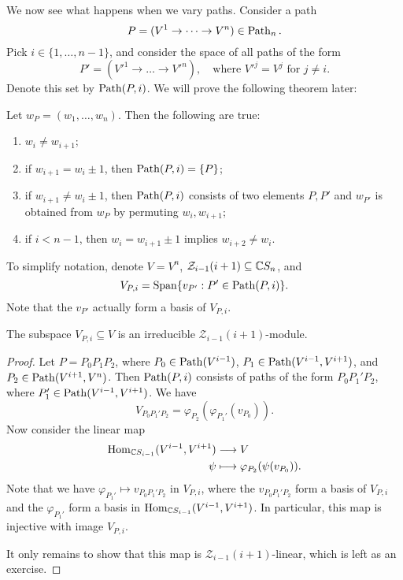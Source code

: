 \begin{remark}
  We now see what happens when we
  vary paths. Consider a path
  \[P = (V^1 \to \dots \to V^n) \in \operatorname{Path}_n.\]
  Pick $i \in \{1, \ldots, n - 1\}$, and
  consider the space of all paths
  of the form
  \[
    P' = (V'^1 \to \dots \to V'^n),
    \quad \text{where } V'^j = V^j
    \text{ for } j \ne i.
  \]
  Denote this set by $\operatorname{Path}(P, i)$.
  We will prove the following theorem later:
\end{remark}

\begin{theorem}\label{thm:path-varying}
  Let $w_P = (w_1, \dots, w_n)$. Then
  the following are true:
  \begin{enumerate}
    \item $w_i \ne w_{i + 1}$;
    \item if $w_{i + 1} = w_i \pm 1$, then
      $\operatorname{Path}(P, i) = \{P\}$;
    \item if $w_{i + 1} \ne w_i \pm 1$, then
      $\operatorname{Path}(P, i)$ consists of
      two elements $P, P'$ and
      $w_{P'}$ is obtained from
      $w_P$ by permuting
      $w_i, w_{i + 1}$;
    \item if $i < n - 1$, then
      $w_i = w_{i + 1} \pm 1$ implies
      $w_{i + 2} \ne w_i$.
  \end{enumerate}
\end{theorem}

\begin{remark}
  To simplify notation, denote
  $V = V^n$, $\mathcal{Z}_{i - 1}(i + 1) \subseteq \mathbb{C} S_n$, and
  \[
    V_{P, i} = \operatorname{Span}\{v_{P'} : P' \in \operatorname{Path}(P, i)\}.
  \]
  Note that
  the $v_{P'}$ actually form a basis of
  $V_{P, i}$.
\end{remark}

\begin{prop}
  The subspace $V_{P, i} \subseteq V$
  is an irreducible $\mathcal{Z}_{i - 1}(i + 1)$-module.
\end{prop}

\begin{proof}
  Let $P = P_0 P_1 P_2$, where
  $P_0 \in \operatorname{Path}(V^{i - 1})$,
  $P_1 \in \operatorname{Path}(V^{i - 1}, V^{i + 1})$,
  and $P_2 \in \operatorname{Path}(V^{i + 1}, V^n)$.
  Then
  $\operatorname{Path}(P, i)$ consists of paths of
  the form $P_0 P_1' P_2$,
  where $P_1' \in \operatorname{Path}(V^{i - 1}, V^{i + 1})$.
  We have
  \[
    V_{P_0 P_1' P_2}
    = \varphi_{P_2}(\varphi_{P_1'}(v_{P_0})).
  \]
  Now consider the linear map
  \begin{align*}
    \operatorname{Hom}_{\mathbb{C} S_{i - 1}}(V^{i - 1}, V^{i + 1})
    &\longrightarrow V \\
    \psi &\longmapsto \varphi_{P_2}(\psi(v_{P_0})).
  \end{align*}
  Note that we have $\varphi_{P_1'} \mapsto v_{P_0 P_1' P_2}$
  in $V_{P, i}$, where the
  $v_{P_0 P_1' P_2}$ form a basis of
  $V_{P, i}$
  and the $\varphi_{P_1'}$ form a basis
  in $\operatorname{Hom}_{\mathbb{C} S_{i - 1}}(V^{i - 1}, V^{i + 1})$.
  In particular, this map is
  injective with image $V_{P, i}$.

  It only remains to show that this map
  is $\mathcal{Z}_{i - 1}(i + 1)$-linear,
  which is left as an exercise.
\end{proof}

